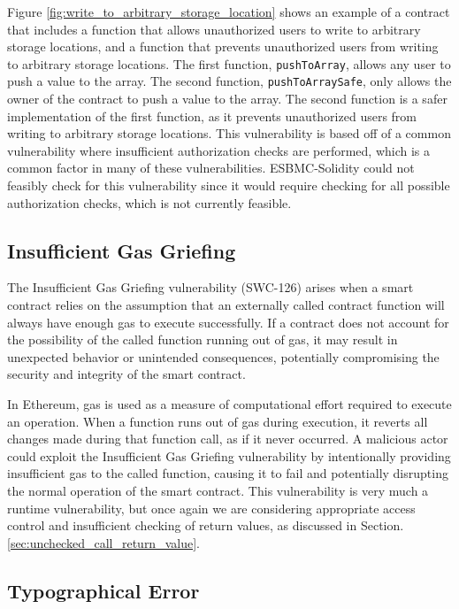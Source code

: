 Figure \ref{fig:write_to_arbitrary_storage_location} shows an example of a contract that includes a function that allows unauthorized users to write to arbitrary storage locations, and a function that prevents unauthorized users from writing to arbitrary storage locations. The first function, \verb|pushToArray|, allows any user to push a value to the array. The second function, \verb|pushToArraySafe|, only allows the owner of the contract to push a value to the array. The second function is a safer implementation of the first function, as it prevents unauthorized users from writing to arbitrary storage locations. This vulnerability is based off of a common vulnerability where insufficient authorization checks are performed, which is a common factor in many of these vulnerabilities. ESBMC-Solidity could not feasibly check for this vulnerability since it would require checking for all possible authorization checks, which is not currently feasible.

\subsection{Insufficient Gas Griefing}
\label{sec:insufficient_gas_griefing}

The Insufficient Gas Griefing vulnerability (SWC-126) arises when a smart contract relies on the assumption that an externally called contract function will always have enough gas to execute successfully. If a contract does not account for the possibility of the called function running out of gas, it may result in unexpected behavior or unintended consequences, potentially compromising the security and integrity of the smart contract.

In Ethereum, gas is used as a measure of computational effort required to execute an operation. When a function runs out of gas during execution, it reverts all changes made during that function call, as if it never occurred. A malicious actor could exploit the Insufficient Gas Griefing vulnerability by intentionally providing insufficient gas to the called function, causing it to fail and potentially disrupting the normal operation of the smart contract. This vulnerability is very much a runtime vulnerability, but once again we are considering appropriate access control and insufficient checking of return values, as discussed in Section. \ref{sec:unchecked_call_return_value}.


\subsection{Typographical Error}
\label{sec:typographical_error}

